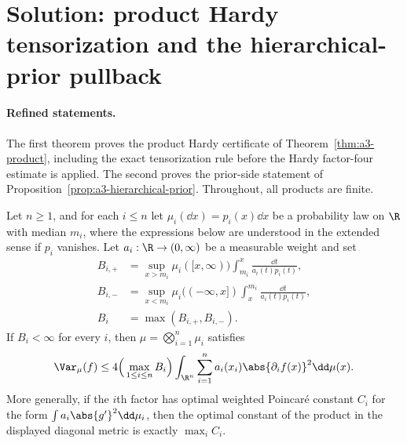 \documentclass[../main.tex]{subfiles}
\begin{document}

\section*{Solution: product Hardy tensorization and the hierarchical-prior pullback}
\label{sec:sol-a3-product-hierarchical-prior}

\paragraph{Refined statements.}
The first theorem proves the product Hardy certificate of
Theorem~\ref{thm:a3-product}, including the exact tensorization rule before the Hardy
factor-four estimate is applied.  The second proves the prior-side statement of
Proposition~\ref{prop:a3-hierarchical-prior}.  Throughout, all products are finite.

\begin{theorem}
\label{thm:sol-a3-product}
Let $n\ge1$, and for each $i\le n$ let $\mu_i(\dd x)=p_i(x)\dd x$ be a probability law on
$\R$ with median $m_i$, where the expressions below are understood in the extended sense if
$p_i$ vanishes.  Let $a_i:\R\to(0,\infty)$ be a measurable weight and set
\begin{align*}
 B_{i,+}
 &=\sup_{x>m_i}\mu_i([x,\infty))
             \int_{m_i}^x\frac{\dd t}{a_i(t)p_i(t)},\\
 B_{i,-}
 &=\sup_{x<m_i}\mu_i(({-\infty},x])
             \int_x^{m_i}\frac{\dd t}{a_i(t)p_i(t)},\\
 B_i&=\max(B_{i,+},B_{i,-}).
\end{align*}
If $B_i<\infty$ for every $i$, then $\mu=\bigotimes_{i=1}^n\mu_i$ satisfies
\begin{equation}
\label{eq:sol-a3-product-hardy}
 \Var_\mu(f)
 \le 4\Big(\max_{1\le i\le n}B_i\Big)
 \int_{\R^n}\sum_{i=1}^n a_i(x_i)\abs{\partial_i f(x)}^2\dd\mu(x).
\end{equation}
More generally, if the $i$th factor has optimal weighted Poincar\'e constant $C_i$ for
the form $\int a_i\abs{g'}^2\dd\mu_i$, then the optimal constant of the product in the
displayed diagonal metric is exactly $\max_i C_i$.
\end{theorem}
\end{document}
